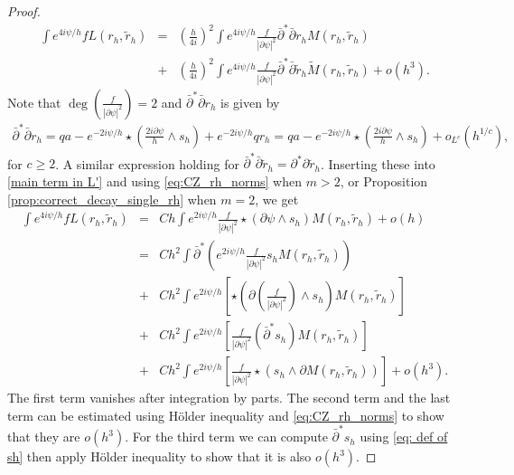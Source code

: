 \documentclass[12pt]{amsart}
\theoremstyle{definition}
\theoremstyle{remark}
\begin{document}
{\begin{proof}
{\begin{eqnarray}
\label{main term in L'}\nonumber
\int e^{4i\psi/h}f L(r_h,\tilde r_h)
&=&\left(\frac{h}{4i}\right)^2\int e^{4i\psi/h}\frac{f}{|\partial\psi|^2}\bar\partial^*\bar\partial r_h M(r_h, \tilde r_h)\\&+&\left(\frac{h}{4i}\right)^2\int e^{4i\psi/h}\frac{f}{|\partial\psi|^2}\bar\partial^*\bar\partial\tilde r_h \widetilde M(r_h, \tilde r_h)+o(h^3).
\end{eqnarray}
Note that {\color{black}$\deg\left(\frac{f}{|\partial\psi|^2}\right) = 2$} and $\bar\partial^*\bar\partial r_h$ is given by
\begin{eqnarray*}
\bar\partial^*\bar\partial r_h
=%
qa- e^{-2i\psi/h}\star \left(\frac{2i\partial\psi}{h}\wedge s_h\right) +e^{-2i\psi/h}qr_h
=qa-e^{-2i\psi/h}\star\left(\frac{2i\partial\psi}{h} \wedge s_h\right)+ o_{L^c}(h^{1/c}),
\end{eqnarray*}
for $c\geq 2$. A similar expression holding for $\bar\partial^*\bar\partial\tilde r_h = \partial^*\partial \tilde r_h$. Inserting these into \eqref{main term in L'} and using \eqref{eq:CZ_rh_norms} when $m >2$, or Proposition \ref{prop:correct_decay_single_rh} when $m = 2$, we get
\begin{eqnarray}\label{r-M-estimate}\nonumber
\int e^{4i\psi/h}f L(r_h,\tilde r_h)
&=&Ch\int e^{2i\psi/h}\frac{f}{|\partial\psi|^2}\star(\partial\psi\wedge s_h) M(r_h,\tilde r_h)+o(h)\\\nonumber
&=& Ch^2\int\bar\partial^*\left(  e^{2i\psi/h}\frac{f}{|\partial\psi|^2}s_h M(r_h,\tilde r_h) \right)\\\nonumber
&+&Ch^2\int e^{2i\psi/h}\left[\star  \left(\partial\left(\frac{f}{|\partial\psi|^2}\right)\wedge s_h\right) M(r_h,\tilde r_h)\right]\\&+& Ch^2\int e^{2i\psi/h}\left[\frac{f}{|\partial\psi|^2}(\bar\partial^* s_h) M(r_h,\tilde r_h)\right]\\\nonumber
&+& Ch^2\int e^{2i\psi/h}\left[\frac{f}{|\partial\psi|^2}\star(s_h\wedge \partial M(r_h,\tilde r_h))\right]+o(h^3).
\end{eqnarray}
The first term vanishes after integration by parts. The second term and the last term can be estimated using H\"older inequality and \eqref{eq:CZ_rh_norms} to show that they are $o(h^3)$. For the third term we can compute $\bar\partial^* s_h$ using \eqref{eq: def of sh} then apply H\"older inequality to show that it is also $o(h^3)$.


}
\end{proof}}
\end{document}
